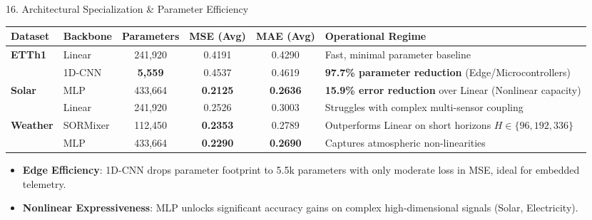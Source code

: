\documentclass[aspectratio=169, 10pt]{beamer}
\begin{document}
\begin{frame}{16. Architectural Specialization \& Parameter Efficiency}
\begin{table}[htbp]
\centering
\scriptsize
\begin{tabular}{llcccl}
\toprule
\textbf{Dataset} & \textbf{Backbone} & \textbf{Parameters} & \textbf{MSE (Avg)} & \textbf{MAE (Avg)} & \textbf{Operational Regime} \\
\midrule
\textbf{ETTh1} & Linear   & 241,920 & 0.4191 & 0.4290 & Fast, minimal parameter baseline \\
              & 1D-CNN   & \textbf{5,559}  & 0.4537 & 0.4619 & \textbf{97.7\% parameter reduction} (Edge/Microcontrollers) \\
\midrule
\textbf{Solar} & MLP      & 433,664 & \textbf{0.2125} & \textbf{0.2636} & \textbf{15.9\% error reduction} over Linear (Nonlinear capacity) \\
              & Linear   & 241,920 & 0.2526 & 0.3003 & Struggles with complex multi-sensor coupling \\
\midrule
\textbf{Weather}& SORMixer & 112,450 & \textbf{0.2353} & 0.2789 & Outperforms Linear on short horizons $H \in \{96, 192, 336\}$ \\
               & MLP      & 433,664 & \textbf{0.2290} & \textbf{0.2690} & Captures atmospheric non-linearities \\
\bottomrule
\end{tabular}
\end{table}
\vspace{-0.1cm}
\begin{itemize}
    \item \textbf{Edge Efficiency}: 1D-CNN drops parameter footprint to 5.5k parameters with only moderate loss in MSE, ideal for embedded telemetry.
    \item \textbf{Nonlinear Expressiveness}: MLP unlocks significant accuracy gains on complex high-dimensional signals (Solar, Electricity).
\end{itemize}
\end{frame}
\end{document}
